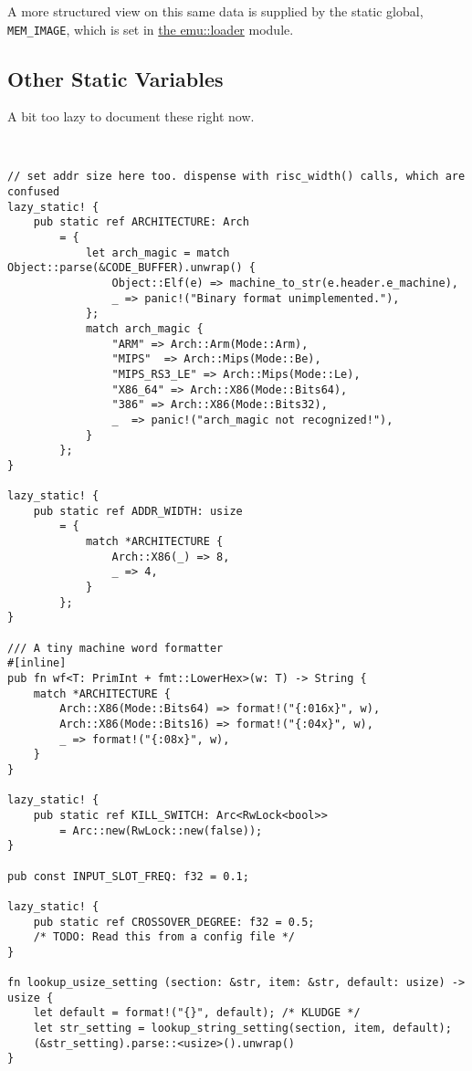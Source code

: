 \documentclass[11pt]{article}
\begin{document}
A more structured view on this same data is supplied by the static global,
\texttt{MEM\_IMAGE}, which is set in \href{../emu/loader.pdf}{the emu::loader} module.


\subsection{Other Static Variables}
\label{sec:orgba7d9b3}

A bit too lazy to document these right now. 
\lstset{language=rust,label=org16a0390,caption= ,captionpos=b,numbers=none}
\begin{lstlisting}


// set addr size here too. dispense with risc_width() calls, which are confused
lazy_static! {
    pub static ref ARCHITECTURE: Arch
        = {
            let arch_magic = match Object::parse(&CODE_BUFFER).unwrap() {
                Object::Elf(e) => machine_to_str(e.header.e_machine),
                _ => panic!("Binary format unimplemented."),
            };
            match arch_magic {
                "ARM" => Arch::Arm(Mode::Arm),
                "MIPS"  => Arch::Mips(Mode::Be),
                "MIPS_RS3_LE" => Arch::Mips(Mode::Le),
                "X86_64" => Arch::X86(Mode::Bits64),
                "386" => Arch::X86(Mode::Bits32),
                _  => panic!("arch_magic not recognized!"),
            }
        };
}

lazy_static! {
    pub static ref ADDR_WIDTH: usize
        = {
            match *ARCHITECTURE {
                Arch::X86(_) => 8,
                _ => 4,
            }
        };
}

/// A tiny machine word formatter
#[inline]
pub fn wf<T: PrimInt + fmt::LowerHex>(w: T) -> String {
    match *ARCHITECTURE {
        Arch::X86(Mode::Bits64) => format!("{:016x}", w),
        Arch::X86(Mode::Bits16) => format!("{:04x}", w),
        _ => format!("{:08x}", w),
    }
}

lazy_static! {
    pub static ref KILL_SWITCH: Arc<RwLock<bool>>
        = Arc::new(RwLock::new(false));
}

pub const INPUT_SLOT_FREQ: f32 = 0.1;

lazy_static! {
    pub static ref CROSSOVER_DEGREE: f32 = 0.5;
    /* TODO: Read this from a config file */
}

fn lookup_usize_setting (section: &str, item: &str, default: usize) -> usize {
    let default = format!("{}", default); /* KLUDGE */ 
    let str_setting = lookup_string_setting(section, item, default);
    (&str_setting).parse::<usize>().unwrap()
}


\end{lstlisting}
\end{document}
